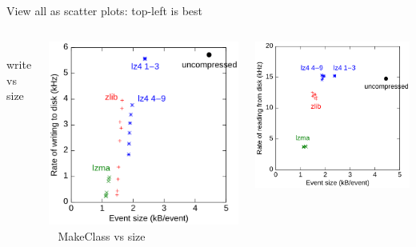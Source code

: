 \documentclass{beamer}
\begin{document}
\begin{frame}{View all as scatter plots: top-left is best}
\vspace{0.5 cm}
\begin{columns}
\mbox{ } \hfill write vs size \hfill \mbox{ }

\includegraphics[width=\linewidth]{write.png}
\vspace{3 cm}
\mbox{ } \hfill MakeClass vs size \hfill \mbox{ }

\includegraphics[width=\linewidth]{read.png}
\vspace{3 cm}


\end{columns}
\end{frame}
\end{document}

